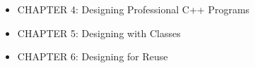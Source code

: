 

\begin{itemize}
\item
CHAPTER 4: Designing Professional C++ Programs

\item
CHAPTER 5: Designing with Classes

\item
CHAPTER 6: Designing for Reuse
\end{itemize}